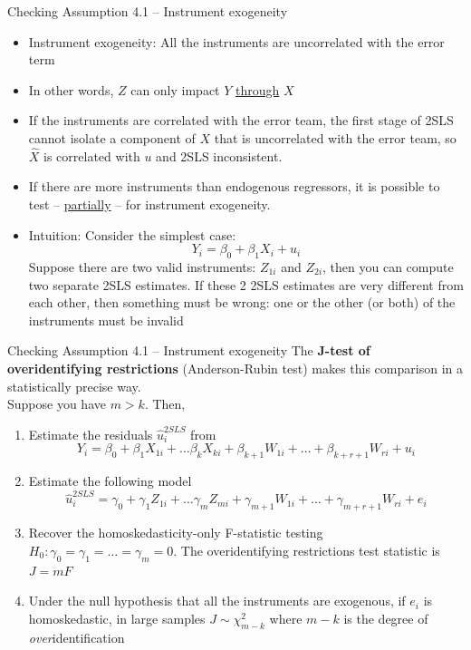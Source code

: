 \documentclass[notes,10pt, aspectratio=169]{beamer}
\begin{document}
\begin{frame}{Checking Assumption 4.1 -- Instrument exogeneity}
\begin{itemize}
    \item Instrument exogeneity: All the instruments are uncorrelated with the error term
    \item In other words, $Z$ can only impact $Y$ \underline{through} $X$
    \item If the instruments are correlated with the error team, the first stage of 2SLS cannot isolate a component of $X$ that is uncorrelated with the error team, so $\hat{X}$ is correlated with $u$ and 2SLS inconsistent.
    \item If there are more instruments than endogenous regressors, it is possible to test -- \underline{partially} -- for instrument exogeneity.
    \item Intuition: Consider the simplest case:
    \begin{equation*}
        Y_i = \beta_0 + \beta_1 X_i + u_i
    \end{equation*}
    Suppose there are two valid instruments: $Z_{1i}$ and $Z_{2i}$, then you can compute two separate 2SLS estimates. If these 2 2SLS estimates are very different from each other, then something must be wrong: one or the other (or both) of the instruments must be invalid
\end{itemize}
\end{frame}

\begin{frame}{Checking Assumption 4.1 -- Instrument exogeneity}
The \textbf{J-test of overidentifying restrictions} (Anderson-Rubin test) makes this comparison in a statistically precise way.\\[1em]

Suppose you have $m>k$. Then,
\begin{enumerate}
    \item Estimate the residuals $\hat{u}^{2SLS}_i$ from
    \begin{equation*}
        Y_i = \beta_0 + \beta_1 X_{1i} + \dots   \beta_k X_{ki} +  \beta_{k+1} W_{1i} + \dots + \beta_{k+r+1} W_{ri} + u_i
    \end{equation*}
    \item Estimate the following model
    \begin{equation*}
        \hat{u}^{2SLS}_i = \gamma_0 + \gamma_1 Z_{1i} + \dots   \gamma_m Z_{mi} +  \gamma_{m+1} W_{1i} + \dots + \gamma_{m+r+1} W_{ri} + e_i
    \end{equation*}
    \item Recover the homoskedasticity-only F-statistic testing $H_0: \gamma_0=\gamma_1=\dots=\gamma_m=0$. The overidentifying restrictions test statistic is $J = mF$
    \item Under the null hypothesis that all the instruments
are exogenous, if $e_i$ is homoskedastic, in large samples $J\sim\chi^2_{m-k}$ where $m-k$ is the degree of \textit{over}identification
\end{enumerate}
\end{frame}
\end{document}

